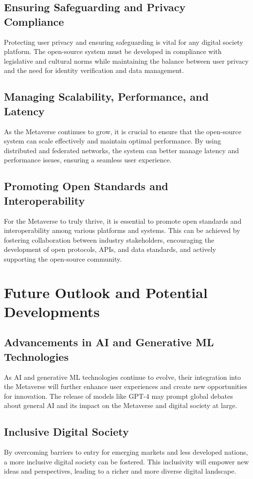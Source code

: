 \subsection{Ensuring Safeguarding and Privacy Compliance}
Protecting user privacy and ensuring safeguarding is vital for any digital society platform. The open-source system must be developed in compliance with legislative and cultural norms while maintaining the balance between user privacy and the need for identity verification and data management.

\subsection{Managing Scalability, Performance, and Latency}
As the Metaverse continues to grow, it is crucial to ensure that the open-source system can scale effectively and maintain optimal performance. By using distributed and federated networks, the system can better manage latency and performance issues, ensuring a seamless user experience.

\subsection{Promoting Open Standards and Interoperability}
For the Metaverse to truly thrive, it is essential to promote open standards and interoperability among various platforms and systems. This can be achieved by fostering collaboration between industry stakeholders, encouraging the development of open protocols, APIs, and data standards, and actively supporting the open-source community.

\section{Future Outlook and Potential Developments}
\subsection{Advancements in AI and Generative ML Technologies}
As AI and generative ML technologies continue to evolve, their integration into the Metaverse will further enhance user experiences and create new opportunities for innovation. The release of models like GPT-4 may prompt global debates about general AI and its impact on the Metaverse and digital society at large.

\subsection{Inclusive Digital Society}
By overcoming barriers to entry for emerging markets and less developed nations, a more inclusive digital society can be fostered. This inclusivity will empower new ideas and perspectives, leading to a richer and more diverse digital landscape.

